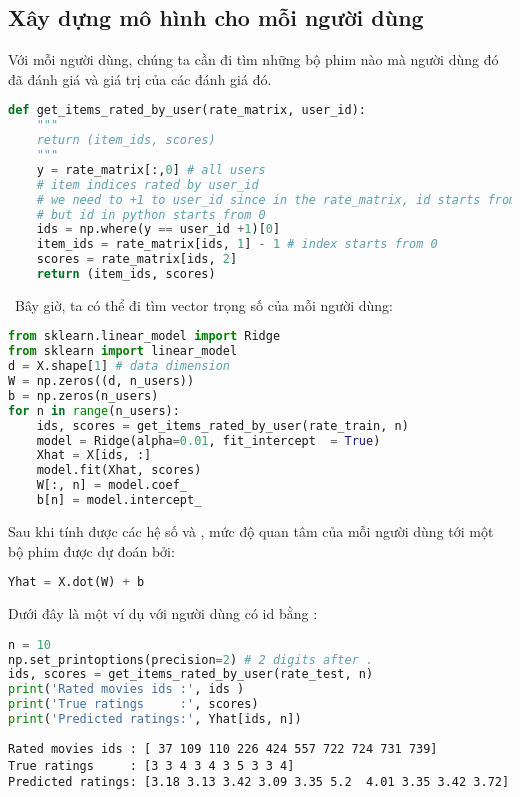 \subsection{Xây dựng mô hình cho mỗi người dùng}
Với mỗi người dùng, chúng ta cần đi tìm những bộ phim nào mà
người dùng đó đã đánh giá và giá trị của các đánh giá đó.
\begin{lstlisting}[language=Python]
def get_items_rated_by_user(rate_matrix, user_id):
    """
    return (item_ids, scores)
    """
    y = rate_matrix[:,0] # all users
    # item indices rated by user_id
    # we need to +1 to user_id since in the rate_matrix, id starts from 1
    # but id in python starts from 0
    ids = np.where(y == user_id +1)[0]
    item_ids = rate_matrix[ids, 1] - 1 # index starts from 0
    scores = rate_matrix[ids, 2]
    return (item_ids, scores)
\end{lstlisting}
\
Bây giờ, ta có thể đi tìm vector trọng số của mỗi người dùng:

\begin{lstlisting}[language=Python]
from sklearn.linear_model import Ridge
from sklearn import linear_model
d = X.shape[1] # data dimension
W = np.zeros((d, n_users))
b = np.zeros(n_users)
for n in range(n_users):
    ids, scores = get_items_rated_by_user(rate_train, n)
    model = Ridge(alpha=0.01, fit_intercept  = True)
    Xhat = X[ids, :]
    model.fit(Xhat, scores)
    W[:, n] = model.coef_
    b[n] = model.intercept_
\end{lstlisting}

Sau khi tính được các hệ số  và ,
mức độ quan tâm của mỗi người dùng tới một bộ phim được dự đoán
bởi:
\begin{lstlisting}[language=Python]
Yhat = X.dot(W) + b
\end{lstlisting}

Dưới đây là một ví dụ với người dùng có {id} bằng :

\begin{lstlisting}[language=Python]
n = 10
np.set_printoptions(precision=2) # 2 digits after .
ids, scores = get_items_rated_by_user(rate_test, n)
print('Rated movies ids :', ids )
print('True ratings     :', scores)
print('Predicted ratings:', Yhat[ids, n])
\end{lstlisting}
\kq
\begin{lstlisting}
Rated movies ids : [ 37 109 110 226 424 557 722 724 731 739]
True ratings     : [3 3 4 3 4 3 5 3 3 4]
Predicted ratings: [3.18 3.13 3.42 3.09 3.35 5.2  4.01 3.35 3.42 3.72]
\end{lstlisting}

